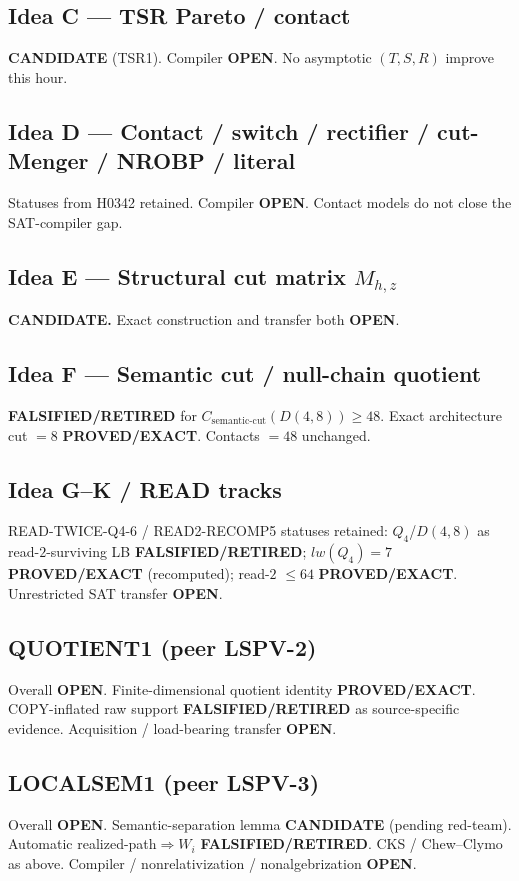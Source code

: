 \documentclass[11pt]{article}
\begin{document}
\subsection*{Idea C --- TSR Pareto / contact}
\textbf{CANDIDATE} (TSR1). Compiler \textbf{OPEN}. No asymptotic $(T,S,R)$ improve this hour.

\subsection*{Idea D --- Contact / switch / rectifier / cut-Menger / NROBP / literal}
Statuses from H0342 retained. Compiler \textbf{OPEN}. Contact models do not close the SAT-compiler gap.

\subsection*{Idea E --- Structural cut matrix $M_{h,z}$}
\textbf{CANDIDATE.} Exact construction and transfer both \textbf{OPEN}.

\subsection*{Idea F --- Semantic cut / null-chain quotient}
\textbf{FALSIFIED/RETIRED} for $C_{\mathrm{semantic\textrm{-}cut}}(D(4,8))\ge48$.
Exact architecture cut $=8$ \textbf{PROVED/EXACT}. Contacts $=48$ unchanged.

\subsection*{Idea G--K / READ tracks}
READ-TWICE-Q4-6 / READ2-RECOMP5 statuses retained: $Q_4$/$D(4,8)$ as read-$2$-surviving LB
\textbf{FALSIFIED/RETIRED}; $lw(Q_4)=7$ \textbf{PROVED/EXACT} (recomputed); read-$2$ $\le64$
\textbf{PROVED/EXACT}. Unrestricted SAT transfer \textbf{OPEN}.

\subsection*{QUOTIENT1 (peer LSPV-2)}
Overall \textbf{OPEN}. Finite-dimensional quotient identity \textbf{PROVED/EXACT}.
COPY-inflated raw support \textbf{FALSIFIED/RETIRED} as source-specific evidence.
Acquisition / load-bearing transfer \textbf{OPEN}.

\subsection*{LOCALSEM1 (peer LSPV-3)}
Overall \textbf{OPEN}. Semantic-separation lemma \textbf{CANDIDATE} (pending red-team).
Automatic realized-path$\Rightarrow W_i$ \textbf{FALSIFIED/RETIRED}.
CKS / Chew--Clymo as above. Compiler / nonrelativization / nonalgebrization \textbf{OPEN}.
\end{document}
